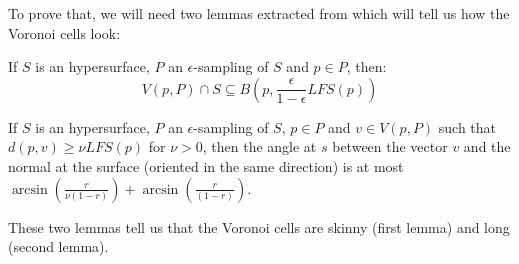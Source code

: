 To prove that, we will need two lemmas extracted from \cite{amenta1999surface}
which will tell us how the Voronoi cells look:
\begin{lemma}
    If $ S $ is an hypersurface, $ P $ an $\epsilon$-sampling of $ S $ and $ p
    \in P $, then:
    $$ V(p, P) \cap S \subseteq B\left(p, \frac{\epsilon}{1 - \epsilon}
        LFS(p)\right) $$
\end{lemma}

\begin{lemma}
    If $ S $ is an hypersurface, $ P $ an $\epsilon$-sampling of $ S $, $ p
    \in P $ and $ v \in V(p, P) $ such that $ d(p, v) \ge \nu LFS(p) $ for $ \nu
    > 0 $, then the angle at $ s $ between the vector $ v $ and the normal at
    the surface (oriented in the same direction) is at most $
    \arcsin(\frac{r}{\nu(1-r)}) + \arcsin(\frac{r}{(1-r)}) $.
\end{lemma}

These two lemmas tell us that the Voronoi cells are skinny (first lemma) and
long (second lemma).

